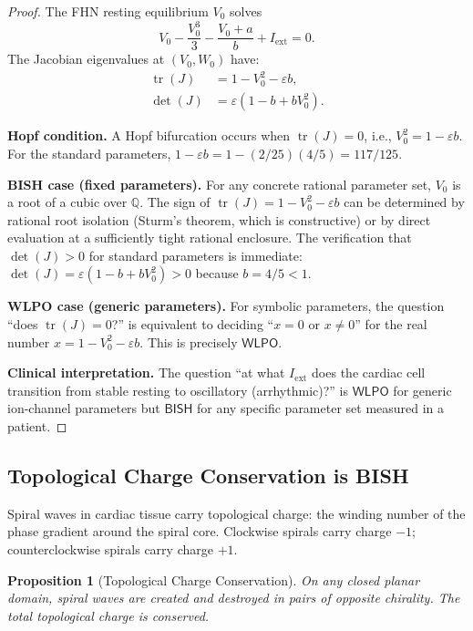 \documentclass[11pt,a4paper]{article}
\theoremstyle{plain}
\newtheorem{proposition}[theorem]{Proposition}
\theoremstyle{definition}
\newcommand{\BISH}{\textsf{BISH}}
\newcommand{\WLPO}{\textsf{WLPO}}
\newcommand{\Q}{\mathbb{Q}}
\begin{document}
\begin{proof}
The FHN resting equilibrium $V_0$ solves
\[
  V_0 - \frac{V_0^3}{3} - \frac{V_0 + a}{b} + I_{\mathrm{ext}} = 0.
\]
The Jacobian eigenvalues at $(V_0, W_0)$ have:
\begin{align*}
  \operatorname{tr}(J) &= 1 - V_0^2 - \varepsilon b, \\
  \det(J) &= \varepsilon(1 - b + bV_0^2).
\end{align*}

\textbf{Hopf condition.}  A Hopf bifurcation occurs when $\operatorname{tr}(J) = 0$, i.e., $V_0^2 = 1 - \varepsilon b$.  For the standard parameters, $1 - \varepsilon b = 1 - (2/25)(4/5) = 117/125$.

\textbf{BISH case (fixed parameters).}  For any concrete rational parameter set, $V_0$ is a root of a cubic over $\Q$.  The sign of $\operatorname{tr}(J) = 1 - V_0^2 - \varepsilon b$ can be determined by rational root isolation (Sturm's theorem, which is constructive) or by direct evaluation at a sufficiently tight rational enclosure.  The verification that $\det(J) > 0$ for standard parameters is immediate: $\det(J) = \varepsilon(1 - b + bV_0^2) > 0$ because $b = 4/5 < 1$.

\textbf{WLPO case (generic parameters).}  For symbolic parameters, the question ``does $\operatorname{tr}(J) = 0$?'' is equivalent to deciding ``$x = 0$ or $x \neq 0$'' for the real number $x = 1 - V_0^2 - \varepsilon b$.  This is precisely $\WLPO$.

\textbf{Clinical interpretation.}  The question ``at what $I_{\mathrm{ext}}$ does the cardiac cell transition from stable resting to oscillatory (arrhythmic)?'' is $\WLPO$ for generic ion-channel parameters but $\BISH$ for any specific parameter set measured in a patient.
\end{proof}

\subsection{Topological Charge Conservation is BISH}\label{sec:topo}

Spiral waves in cardiac tissue carry topological charge: the winding number of the phase gradient around the spiral core.  Clockwise spirals carry charge $-1$; counterclockwise spirals carry charge $+1$.

\begin{proposition}[Topological Charge Conservation]\label{prop:charge}
On any closed planar domain, spiral waves are created and destroyed in pairs of opposite chirality.  The total topological charge is conserved.
\end{proposition}
\end{document}

